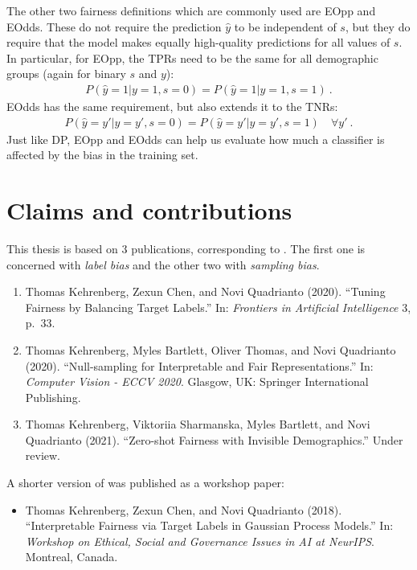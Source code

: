 The other two fairness definitions which are commonly used are \ac{EOpp} and \ac{EOdds}.
These do not require the prediction $\hat{y}$ to be independent of $s$,
but they do require that the model makes equally high-quality predictions for all values of $s$.
In particular, for \ac{EOpp}, the \acp{TPR} need to be the same for all demographic groups
(again for binary $s$ and $y$):
\begin{align}
  \label{eq:eopp-def}
  P(\hat{y}=1|y=1,s=0) = P(\hat{y}=1|y=1,s=1)~.
\end{align}
\ac{EOdds} has the same requirement, but also extends it to the \acp{TNR}:
\begin{align}
  P(\hat{y}=y'|y=y',s=0) = P(\hat{y}=y'|y=y',s=1)\quad\forall y'~.
  \label{eq:eodds-def}
\end{align}
Just like \ac{DP},
\ac{EOpp} and \ac{EOdds} can help us evaluate how much a classifier is affected by the bias in the training set.

\section{Claims and contributions}%
\label{sec:claims-contributions}
This thesis is based on 3 publications, corresponding to .
The first one is concerned with \emph{label bias} and the other two with \emph{sampling bias}.
\begin{enumerate}
  \item Thomas Kehrenberg, Zexun Chen, and Novi Quadrianto (2020). ``Tuning Fairness by Balancing Target Labels.''
    In: \emph{Frontiers in Artificial Intelligence} 3, p.\ 33.
    \citep{kehrenberg2020tuning}
  \item Thomas Kehrenberg, Myles Bartlett, Oliver Thomas, and Novi Quadrian\-to (2020).
    ``Null-sampling for Interpretable and Fair Representations.''
    In: \emph{Computer Vision - ECCV 2020}. Glasgow, UK: Springer International Publishing.
    \citep{kehrenberg2020nullsampling}
  \item Thomas Kehrenberg, Viktoriia Sharmanska, Myles Bartlett, and Novi Quadrianto (2021).
    ``Zero-shot Fairness with Invisible Demographics.''
    Under review.
    \citep{kehrenberg2020zeroshot}
\end{enumerate}
A shorter version of \citet{kehrenberg2020tuning} was published as a workshop paper:
\begin{itemize}
  \item Thomas Kehrenberg, Zexun Chen, and Novi Quadrianto (2018).
    ``Interpretable Fairness via Target Labels in Gaussian Process Models.''
    In: \emph{Workshop on Ethical, Social and Governance Issues in AI at NeurIPS}. Montreal, Canada.
\end{itemize}


